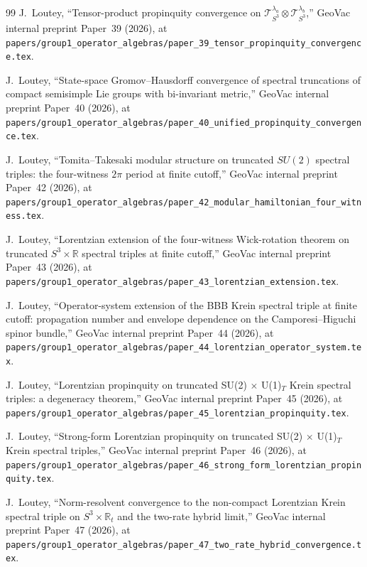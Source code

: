 \documentclass[11pt,a4paper]{article}
\theoremstyle{plain}
\theoremstyle{definition}
\newcommand{\sthree}{S^{3}}
\newcommand{\Tcal}{\mathcal{T}}
\newcommand{\R}{\mathbb{R}}
\begin{document}
\begin{thebibliography}{99}
J.~Loutey, ``Tensor-product propinquity convergence on
$\Tcal_{S^{3}}^{\lambda_{a}}\otimes\Tcal_{S^{3}}^{\lambda_{b}}$,''
GeoVac internal preprint Paper~39 (2026), at
\texttt{papers/group1\_operator\_algebras/paper\_39\_tensor\_propinquity\_convergence.tex}.

J.~Loutey, ``State-space Gromov--Hausdorff convergence of spectral
truncations of compact semisimple Lie groups with bi-invariant metric,'' GeoVac
internal preprint Paper~40 (2026), at
\texttt{papers/group1\_operator\_algebras/paper\_40\_unified\_propinquity\_convergence.tex}.

J.~Loutey, ``Tomita--Takesaki modular structure on truncated $SU(2)$
spectral triples: the four-witness $2\pi$ period
at finite cutoff,'' GeoVac internal preprint Paper~42 (2026), at
\texttt{papers/group1\_operator\_algebras/paper\_42\_modular\_hamiltonian\_four\_witness.tex}.

J.~Loutey, ``Lorentzian extension of the four-witness Wick-rotation
theorem on truncated $S^3 \times \mathbb{R}$ spectral triples at finite
cutoff,'' GeoVac internal preprint
Paper~43 (2026), at
\texttt{papers/group1\_operator\_algebras/paper\_43\_lorentzian\_extension.tex}.

J.~Loutey, ``Operator-system extension of the BBB Krein spectral
triple at finite cutoff: propagation number and envelope dependence
on the Camporesi--Higuchi spinor bundle,'' GeoVac internal preprint Paper~44 (2026),
at
\texttt{papers/group1\_operator\_algebras/paper\_44\_lorentzian\_operator\_system.tex}.

J.~Loutey, ``Lorentzian propinquity on truncated SU(2)
$\times$ U(1)$_{T}$ Krein spectral triples: a degeneracy theorem,'' GeoVac internal
preprint Paper~45 (2026), at
\texttt{papers/group1\_operator\_algebras/paper\_45\_lorentzian\_propinquity.tex}.

J.~Loutey, ``Strong-form Lorentzian propinquity on
truncated SU(2) $\times$ U(1)$_{T}$ Krein spectral triples,''
GeoVac internal preprint Paper~46 (2026), at
\texttt{papers/group1\_operator\_algebras/paper\_46\_strong\_form\_lorentzian\_propinquity.tex}.

J.~Loutey, ``Norm-resolvent convergence to the non-compact Lorentzian
Krein spectral triple on $\sthree\times\R_{t}$ and the two-rate
hybrid limit,'' GeoVac internal preprint Paper~47 (2026), at
\texttt{papers/group1\_operator\_algebras/paper\_47\_two\_rate\_hybrid\_convergence.tex}.

\end{thebibliography}
\end{document}
